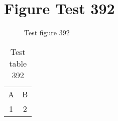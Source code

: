 \documentclass{article}
\begin{document}
\section{Figure Test 392}
\begin{figure}[h]
\caption{Test figure 392}
\end{figure}
\begin{table}[h]
\caption{Test table 392}
\begin{tabular}{cc}
A & B \\
1 & 2
\end{tabular}
\end{table}
\end{document}
